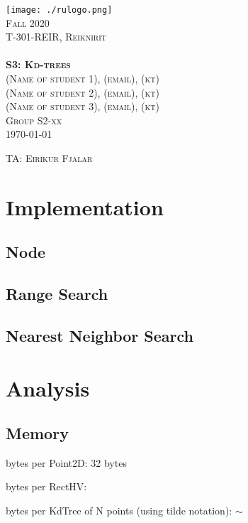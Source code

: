 \documentclass[11pt,a4paper,notitlepage]{article}
\newcommand{\semester}{Fall 2020}
\newcommand{\coursename}{Reiknirit}
\newcommand{\courseid}{T-301-REIR}
\newcommand{\assignment}{S3: Kd-trees}
\newcommand{\dateofcompilation}{\today}
\newcommand{\maketitlepage}[1]
{
    \begin{titlepage}

        \begin{center}
            \texttt{[image: ./rulogo.png]}\\[1.5cm]

            \textsc{\huge \semester}\\[0.8cm]

            {\textsc{\Huge \courseid, \coursename}}\\[0.4cm]
            \textsc{\LARGE }\\[2.5cm]

            \textbf{\textsc{\Huge #1}}\\[3cm]


            \textsc{\LARGE (Name of student 1), (email), (kt)}\\  %
            \textsc{\LARGE (Name of student 2), (email), (kt)}\\  %
            \textsc{\LARGE (Name of student 3), (email), (kt)}\\[0.6cm]  %
            \textsc{\LARGE Group S2-xx}\\[1cm]
            \textsc{\Large \dateofcompilation}


        \end{center}

        \vfill

        \begin{flushleft}
            \textsc{\Large TA: Eiríkur Fjalar}   %

        \end{flushleft}

    \end{titlepage}
}
\newcommand{\explanation}[1]{}  %
\begin{document}
    \maketitlepage{\assignment}

\explanation{Directions on performing the assignment are showed here in italics (like this). These should not be included in the report you submit.}


\section{Implementation}

\subsection*{Node}

\explanation{Describe the Node data type you used to implement the
  2d-tree data structure.}

\subsection*{Range Search}
\explanation{Describe your method for range search in a kd-tree.}

\subsection*{Nearest Neighbor Search}
\explanation{Describe your method for nearest neighbor search in a kd-tree.}


\section{Analysis}

\subsection*{Memory}
\explanation{
   Give the total memory usage in bytes (using tilde notation and 
   the standard 64-bit memory cost model) of your 2d-tree data
   structure as a function of the number of points N. Justify your
   answer below.
% 
   Include the memory for all referenced objects (deep memory),
   including memory for the nodes, points, and rectangles.
}

bytes per Point2D: 32 bytes

bytes per RectHV:

bytes per KdTree of N points (using tilde notation):   $\sim$
\end{document}
